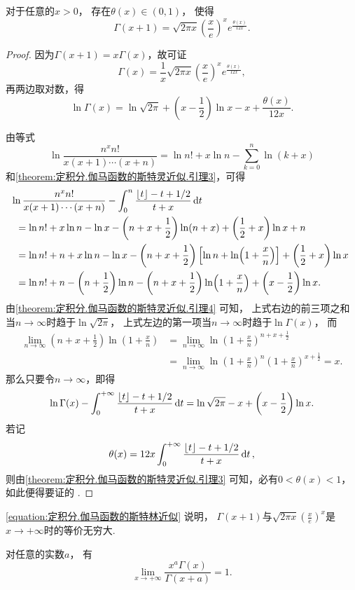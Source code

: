 \begin{theorem}
对于任意的\(x>0\)，
存在\(\theta(x)\in(0,1)\)，
使得\begin{equation}\label{equation:定积分.伽马函数的斯特林近似}
	\Gamma(x+1) = \sqrt{2\pi x}
		\left(\frac{x}{e}\right)^x e^{\frac{\theta(x)}{12x}}.
\end{equation}
\begin{proof}
因为\(\Gamma(x+1) = x \Gamma(x)\)，故可证\[
\Gamma(x) = \frac{1}{x} \sqrt{2\pi x} \left(\frac{x}{e}\right)^x e^{\frac{\theta(x)}{12x}},
\]再两边取对数，得\[
\ln \Gamma(x) = \ln\sqrt{2\pi} + \left(x - \frac{1}{2}\right) \ln x - x + \frac{\theta(x)}{12x}.
\]

由等式\[
\ln\frac{n^x n!}{x(x+1)\dotsm(x+n)}
= \ln n! + x \ln n - \sum_{k=0}^n \ln(k+x)
\]和\cref{theorem:定积分.伽马函数的斯特灵近似.引理3}，可得\begin{align*}
&\hspace{-5pt}
\ln\frac{n^x n!}{x(x+1)\dotsm(x+n)}
- \int_0^n \frac{\lfloor t\rfloor - t + 1/2}{t + x} \dd{t} \\
&= \ln n! + x \ln n - \ln x - \left(n+x+\frac{1}{2}\right) \ln(n+x) + \left(\frac{1}{2}+x\right) \ln x + n \\
&= \ln n! + n + x \ln n - \ln x
- \left(n+x+\frac{1}{2}\right) \left[\ln n + \ln(1+\frac{x}{n})\right]
+ \left(\frac{1}{2}+x\right) \ln x \\
&= \ln n! + n - \left(n+\frac{1}{2}\right) \ln n
- \left(n+x+\frac{1}{2}\right) \ln(1+\frac{x}{n})
+ \left(x-\frac{1}{2}\right) \ln x.
\end{align*}
由\cref{theorem:定积分.伽马函数的斯特灵近似.引理4} 可知，
上式右边的前三项之和当\(n\to\infty\)时趋于\(\ln\sqrt{2\pi}\)，
上式左边的第一项当\(n\to\infty\)时趋于\(\ln\Gamma(x)\)，
而{%
\def\l{\lim_{n\to\infty}}%
\def\xn{\left(1+\frac{x}{n}\right)}%
\begin{align*}
\l \left(n+x+\frac{1}{2}\right) \ln\xn
&= \l \ln\xn^{n+x+\frac{1}{2}} \\
&= \l \ln\xn^n \xn^{x+\frac{1}{2}}
= x.
\end{align*}}
那么只要令\(n\to\infty\)，即得\[
\ln\Gamma(x) - \int_0^{+\infty} \frac{\lfloor t\rfloor - t + 1/2}{t + x} \dd{t}
= \ln\sqrt{2\pi} - x + \left(x - \frac{1}{2}\right) \ln x.
\]若记\[
\theta(x) = 12 x \int_0^{+\infty} \frac{\lfloor t\rfloor - t + 1/2}{t + x} \dd{t},
\]则由\cref{theorem:定积分.伽马函数的斯特灵近似.引理3} 可知，必有\(0<\theta(x)<1\)，如此便得要证的 .
\end{proof}
\end{theorem}
\begin{remark}
\cref{equation:定积分.伽马函数的斯特林近似} 说明，
\(\Gamma(x+1)\)与\(\sqrt{2\pi x} \left(\frac{x}{e}\right)^x\)是\(x\to+\infty\)时的等价无穷大.
\end{remark}

\begin{corollary}
对任意的实数\(a\)，
有\begin{equation}\label{equation:反常积分.伽马函数.极限1}
	\lim_{x\to+\infty} \frac{x^a \Gamma(x)}{\Gamma(x+a)} = 1.
\end{equation}
\end{corollary}
